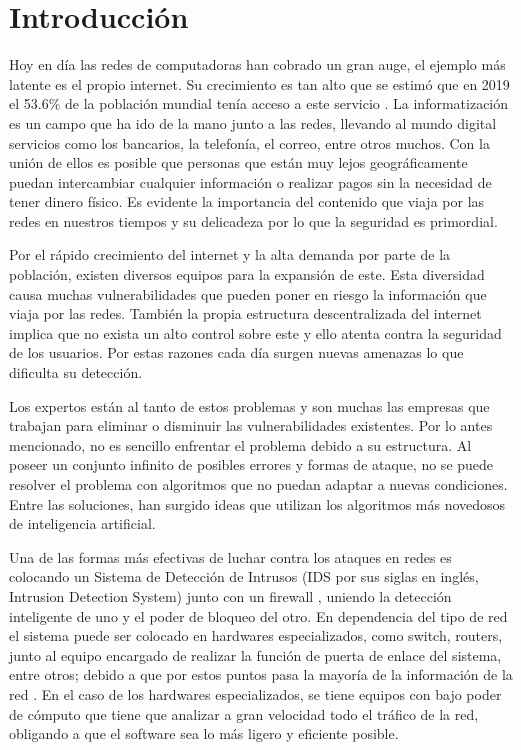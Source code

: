 \chapter*{Introducción}\label{chapter:introduction}

Hoy en día las redes de computadoras han cobrado un gran auge, el ejemplo más latente es el propio internet. Su crecimiento es tan alto que se estimó que en 2019 el 53.6\% de la población mundial tenía acceso a este servicio \cite{internetAcces}. La informatización es un campo que ha ido de la mano junto a las redes, llevando al mundo digital servicios como los bancarios, la telefonía, el correo, entre otros muchos. Con la unión de ellos es posible que personas que están muy lejos geográficamente puedan intercambiar cualquier información o realizar pagos sin la necesidad de tener dinero físico. Es evidente la importancia del contenido que viaja por las redes en nuestros tiempos y su delicadeza por lo que la seguridad es primordial.

Por el rápido crecimiento del internet y la alta demanda por parte de la población, existen diversos equipos para la expansión de este. Esta diversidad causa muchas vulnerabilidades que pueden poner en riesgo la información que viaja por las redes. También la propia estructura descentralizada del internet implica que no exista un alto control sobre este y ello atenta contra la seguridad de los usuarios. Por estas razones cada día surgen nuevas amenazas lo que dificulta su detección.

Los expertos están al tanto de estos problemas y son muchas las empresas que trabajan para eliminar o disminuir las vulnerabilidades existentes. Por lo antes mencionado, no es sencillo enfrentar el problema debido a su estructura. Al poseer un conjunto infinito de posibles errores y formas de ataque, no se puede resolver el problema con algoritmos que no puedan adaptar a nuevas condiciones. Entre las soluciones, han surgido ideas que utilizan los algoritmos más novedosos de inteligencia artificial.

Una de las formas más efectivas de luchar contra los ataques en redes es colocando un Sistema de Detección de Intrusos \cite{scarfone2012guide} (IDS por sus siglas en inglés, Intrusion Detection System) junto con un firewall \cite{wack2002guidelines}, uniendo la detección inteligente de uno y el poder de bloqueo del otro. En dependencia del tipo de red el sistema puede ser colocado en hardwares especializados, como switch, routers, junto al equipo encargado de realizar la función de puerta de enlace del sistema, entre otros; debido a que por estos puntos pasa la mayoría de la información de la red \cite{tanenbaum1996sistemas}. En el caso de los hardwares especializados, se tiene equipos con bajo poder de cómputo que tiene que analizar a gran velocidad todo el tráfico de la red, obligando a que el software sea lo más ligero y eficiente posible.

